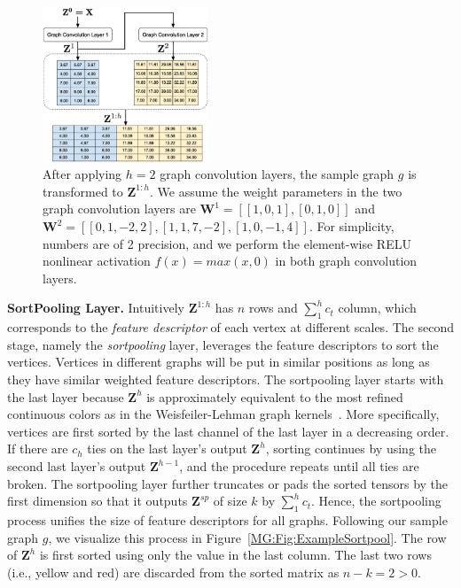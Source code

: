 \begin{figure}[htbp]
\centerline{\includegraphics[width=0.44\textwidth]{Magic/figures/ExampleGraphConvolution.eps}}
\caption{After applying $h=2$ graph convolution layers, the sample graph $g$ is transformed to $\mathbf{Z}^{1:h}$.
We assume the weight parameters in the two graph convolution layers are $\mathbf{W}^1 = [[1, 0 ,1], [0, 1, 0]]$ and $\mathbf{W}^2 = [[0, 1 ,-2, 2], [1, 1, 7, -2], [1, 0, -1, 4]]$.
For simplicity, numbers are of 2 precision, and we perform the element-wise RELU nonlinear activation $f(x) = max(x, 0)$ in both graph convolution layers.}
\label{MG:Fig:ExampleGraphConvolution}
\end{figure}

\textbf{SortPooling Layer.} Intuitively $\mathbf{Z}^{1:h}$ has $n$ rows and $\sum_{1}^{h}c_t$ column, which
corresponds to the \textit{feature descriptor} of each vertex at different scales.
The second stage, namely the \textit{sortpooling} layer,
leverages the feature descriptors to sort the vertices.
Vertices in different graphs will be put in similar positions as long as they have similar weighted feature descriptors.
The sortpooling layer starts with the last layer because $\mathbf{Z}^{h}$ is approximately
equivalent to the most refined continuous colors as in the Weisfeiler-Lehman graph kernels~\cite{WlGraphKernel}.
More specifically, vertices are first sorted by the last channel of the last layer in a decreasing order.
If there are $c_h$ ties on the last layer's output $\mathbf{Z}^{h}$,
sorting continues by using the second last layer's output $\mathbf{Z}^{h - 1}$, and the procedure repeats until all ties are broken.
The sortpooling layer further truncates or pads the sorted tensors by the first dimension so that it outputs $\mathbf{Z}^{sp}$ of size $k$ by $\sum_{1}^{h}c_t$.
Hence, the sortpooling process unifies the size of feature descriptors for all graphs.
Following our sample graph $g$, we visualize this process in Figure~\ref{MG:Fig:ExampleSortpool}.
The row of $\mathbf{Z}^{h}$ is first sorted using only the value in the last column.
The last two rows (i.e., yellow and red) are discarded from the sorted matrix as $n - k = 2 > 0$.

